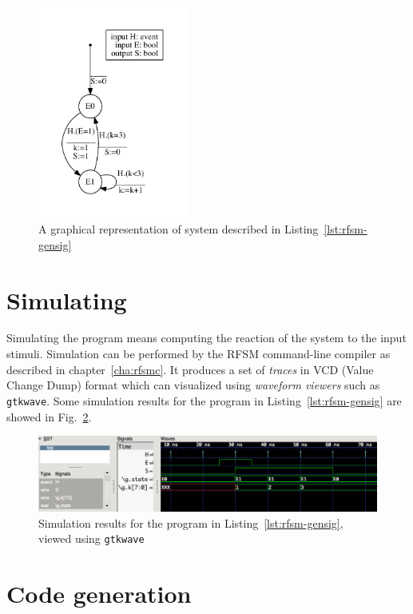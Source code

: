 \begin{figure}[!h]
   \includegraphics[height=7cm]{figs/gensig-top}
   \centering
  \caption{A graphical representation of system described in Listing~\ref{lst:rfsm-gensig}}
  \label{fig:rfsm-gensig-top}
\end{figure}

\section*{Simulating}
\label{sec:simulating-1}

Simulating the program means computing the reaction of the system to the input stimuli. Simulation
can be performed by the RFSM command-line compiler as described in chapter~\ref{cha:rfsmc}.
It produces a set of
\emph{traces} in VCD (Value Change Dump) format which can visualized using \emph{waveform viewers}
such as \texttt{gtkwave}. Some simulation results for the program in Listing~\ref{lst:rfsm-gensig}
are showed in Fig.~\ref{fig:rfsm-gensig-chrono}.

\begin{figure}[!h]
   \includegraphics[width=\textwidth]{figs/gensig-chrono}
   \centering
  \caption{Simulation results for the program in Listing~\ref{lst:rfsm-gensig}, viewed using
    \texttt{gtkwave}}
  \label{fig:rfsm-gensig-chrono}
\end{figure}

\section*{Code generation}
\label{sec:code-generation-1}

